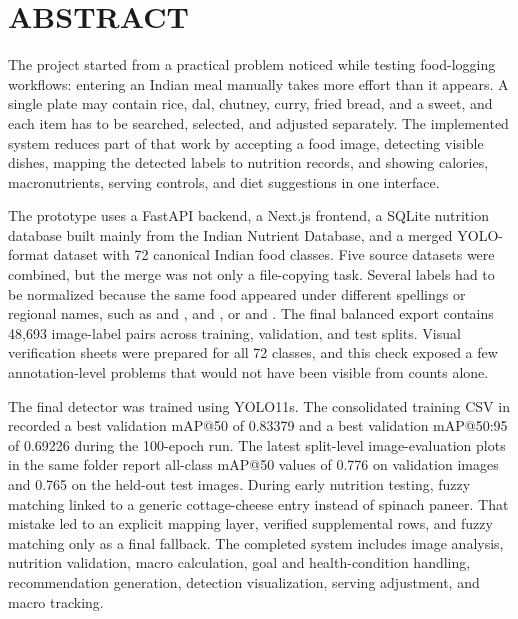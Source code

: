 \chapter*{ABSTRACT}

\begingroup
{}

The project started from a practical problem noticed while testing food-logging workflows: entering an Indian meal manually takes more effort than it appears. A single plate may contain rice, dal, chutney, curry, fried bread, and a sweet, and each item has to be searched, selected, and adjusted separately. The implemented system reduces part of that work by accepting a food image, detecting visible dishes, mapping the detected labels to nutrition records, and showing calories, macronutrients, serving controls, and diet suggestions in one interface.

The prototype uses a FastAPI backend, a Next.js frontend, a SQLite nutrition database built mainly from the Indian Nutrient Database, and a merged YOLO-format dataset with 72 canonical Indian food classes. Five source datasets were combined, but the merge was not only a file-copying task. Several labels had to be normalized because the same food appeared under different spellings or regional names, such as  and ,  and , or  and . The final balanced export contains 48,693 image-label pairs across training, validation, and test splits. Visual verification sheets were prepared for all 72 classes, and this check exposed a few annotation-level problems that would not have been visible from counts alone.

The final detector was trained using YOLO11s. The consolidated training CSV in  recorded a best validation mAP@50 of 0.83379 and a best validation mAP@50:95 of 0.69226 during the 100-epoch run. The latest split-level image-evaluation plots in the same folder report all-class mAP@50 values of 0.776 on validation images and 0.765 on the held-out test images. During early nutrition testing, fuzzy matching linked  to a generic cottage-cheese entry instead of spinach paneer. That mistake led to an explicit mapping layer, verified supplemental rows, and fuzzy matching only as a final fallback. The completed system includes image analysis, nutrition validation, macro calculation, goal and health-condition handling, recommendation generation, detection visualization, serving adjustment, and macro tracking.

\endgroup
